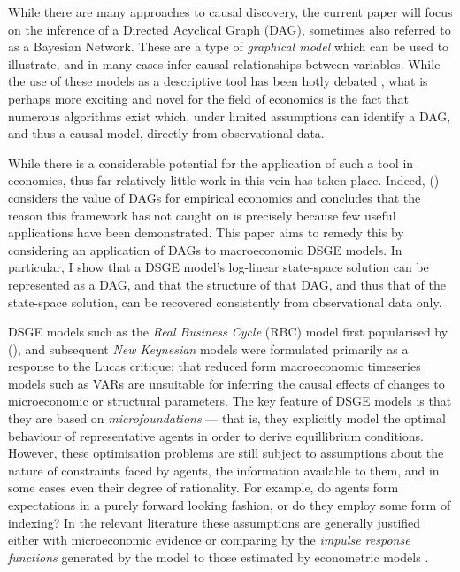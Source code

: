 \documentclass{article}
\begin{document}
While there are many approaches to causal discovery, the current paper will focus on the inference of a Directed Acyclical Graph (DAG), sometimes also referred to as a Bayesian Network. These are a type of \textit{graphical model} which can be used to illustrate, and in many cases infer causal relationships between variables. While the use of these models as a descriptive tool has been hotly debated \parencite{pearl2018book}, what is perhaps more exciting and novel for the field of economics is the fact that numerous algorithms exist which, under limited assumptions can identify a DAG, and thus a causal model, directly from observational data.

While there is a considerable potential for the application of such a tool in economics, thus far relatively little work in this vein has taken place. Indeed, \citeauthor{imbens2019potential} (\citeyear{imbens2019potential}) considers the value of DAGs for empirical economics and concludes that the reason this framework has not caught on is precisely because few useful applications have been demonstrated. This paper aims to remedy this by considering an application of DAGs to macroeconomic DSGE models. In particular, I show that a DSGE model's log-linear state-space solution can be represented as a DAG, and that the structure of that DAG, and thus that of the state-space solution, can be recovered consistently from observational data only. 

DSGE models such as the \textit{Real Business Cycle} (RBC) model first popularised by \citeauthor{kydland1982time} (\citeyear{kydland1982time}), and subsequent \textit{New Keynesian} models were formulated primarily as a response to the Lucas critique; that reduced form macroeconomic timeseries models such as VARs are unsuitable for inferring the causal effects of changes to microeconomic or structural parameters. The key feature of DSGE models is that they are based on \textit{microfoundations} --- that is, they explicitly model the optimal behaviour of representative agents in order to derive equillibrium conditions. However, these optimisation problems are still subject to assumptions about the nature of constraints faced by agents, the information available to them, and in some cases even their degree of rationality. For example, do agents form expectations in a purely forward looking fashion, or do they employ some form of indexing? In the relevant literature these assumptions are generally justified either with microeconomic evidence or comparing by the \textit{impulse response functions} generated by the model to those estimated by econometric models \parencite{christiano2018on}. 
\end{document}
